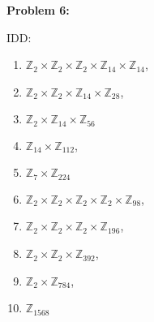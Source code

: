 \documentclass[12pt, letterpaper]{article}
\newenvironment{problem}
    [1]
    {\noindent \textbf{Problem #1:}}
    {\vspace{3mm}}
\begin{document}
\begin{problem}{6}
\begin{enumerate}[(a)]
        IDD:
        \begin{enumerate}[1.]
            \item $\mathbb{Z}_2 \times \mathbb{Z}_2 \times \mathbb{Z}_2 \times \mathbb{Z}_{14}
                \times \mathbb{Z}_{14}$,
            \item $\mathbb{Z}_2 \times \mathbb{Z}_2 \times \mathbb{Z}_{14} \times \mathbb{Z}_{28}$,
            \item $\mathbb{Z}_{2} \times \mathbb{Z}_{14} \times \mathbb{Z}_{56}$
            \item $\mathbb{Z}_{14} \times \mathbb{Z}_{112}$,
            \item $\mathbb{Z}_7 \times \mathbb{Z}_{224}$
            
            \item $\mathbb{Z}_2 \times \mathbb{Z}_2 \times \mathbb{Z}_2 \times \mathbb{Z}_2 
                \times \mathbb{Z}_{98}$,
            \item $\mathbb{Z}_2 \times \mathbb{Z}_2 \times \mathbb{Z}_2 \times \mathbb{Z}_{196}$,
            \item $\mathbb{Z}_2 \times \mathbb{Z}_2 \times \mathbb{Z}_{392}$,
            \item $\mathbb{Z}_2 \times \mathbb{Z}_{784}$,
            \item $\mathbb{Z}_{1568}$
        \end{enumerate}

    \end{enumerate}
\end{problem}
\end{document}
